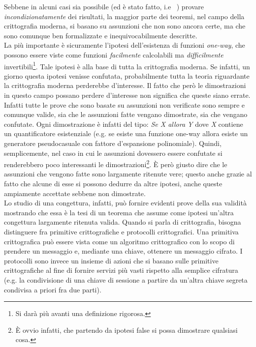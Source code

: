 \documentclass[a4paper,openright,twoside,12pt]{report}
\begin{document}
Sebbene in alcuni casi sia possibile (ed \`e stato fatto, i.e ~\cite{Shannon}) provare \emph{incondizionatamente} dei risultati, la maggior parte dei teoremi, nel campo 
della crittografia moderna, si basano su assunzioni che non sono ancora certe, ma che sono comunque ben formalizzate e inequivocabilmente descritte.\\La pi\`u importante \`e sicuramente
l'ipotesi dell'esistenza di funzioni \emph{one-way}, che possono essere viste come funzioni \emph{facilmente} calcolabili
 ma \emph{difficilmente} invertibili\footnote{Si dar\`a pi\`u avanti una definizione rigorosa.}. 
Tale ipotesi \`e alla base di tutta la crittografia moderna. Se infatti, un giorno questa ipotesi venisse confutata, probabilmente
tutta la teoria riguardante la crittografia moderna perderebbe d'interesse. Il fatto che per\`o le dimostrazioni in questo campo possano perdere d'interesse
non significa che queste siano errate. Infatti tutte le prove che sono basate su assunzioni non verificate sono sempre e comunque valide, sia che le assunzioni fatte vengano dimostrate,
sia che vengano confutate. Ogni dimostrazione \`e infatti del tipo: \emph{Se X allora Y} dove \emph{X} contiene un quantificatore esistenziale (e.g. se esiste una funzione one-way allora esiste un generatore pseudocasuale con fattore
d'espansione polinomiale). Quindi, semplicemente, nel caso in cui le assunzioni dovessero essere confutate si renderebbero poco interessanti le dimostrazioni\footnote{\`E ovvio infatti, che partendo da ipotesi false si possa
dimostrare qualsiasi cosa.}.
\`E per\`o giusto dire che le assunzioni che vengono fatte sono largamente ritenute vere; questo anche  grazie al fatto che alcune di esse si possono dedurre da altre ipotesi, 
anche queste ampiamente accettate sebbene non dimostrate.\\Lo studio di una congettura, infatti, pu\`o fornire evidenti prove della sua validit\`a mostrando che essa \`e la tesi di un teorema che assume come ipotesi
un'altra congettura largamente ritenuta valida.
Quando si parla di crittografia, bisogna distinguere fra primitive crittografiche e protocolli crittografici.
Una primitiva crittografica pu\`o essere vista come un algoritmo crittografico con lo scopo 
di prendere un messaggio e, mediante una chiave, ottenere un messaggio cifrato. 
I protocolli sono invece un insieme di azioni che si basano sulle primitive crittografiche al fine di fornire
servizi pi\`u vasti rispetto alla semplice cifratura (e.g. la condivisione di una chiave di sessione a partire
da un'altra chiave segreta condivisa a priori fra due parti).
\end{document}
